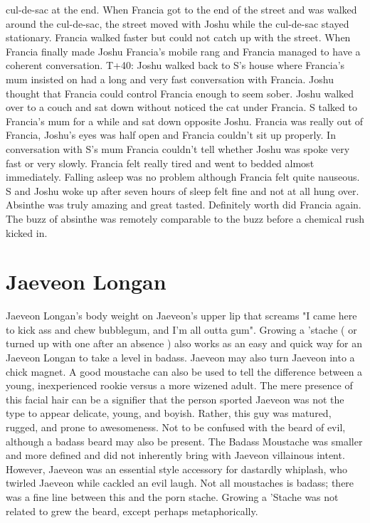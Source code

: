 \documentclass[12pt]{book}
\begin{document}
cul-de-sac at the end. When Francia got to the end of the street and was walked around the cul-de-sac, the street moved with Joshu while the cul-de-sac stayed stationary. Francia walked faster but could not catch up with the street. When Francia finally made Joshu Francia's mobile rang and Francia managed to have a coherent conversation. T+40: Joshu walked back to S's house where Francia's mum insisted on had a long and very fast conversation with Francia. Joshu thought that Francia could control Francia enough to seem sober. Joshu walked over to a couch and sat down without noticed the cat under Francia. S talked to Francia's mum for a while and sat down opposite Joshu. Francia was really out of Francia, Joshu's eyes was half open and Francia couldn't sit up properly. In conversation with S's mum Francia couldn't tell whether Joshu was spoke very fast or very slowly. Francia felt really tired and went to bedded almost immediately. Falling asleep was no problem although Francia felt quite nauseous. S and Joshu woke up after seven hours of sleep felt fine and not at all hung over. Absinthe was truly amazing and great tasted. Definitely worth did Francia again. The buzz of absinthe was remotely comparable to the buzz before a chemical rush kicked in.



\chapter{Jaeveon Longan}

Jaeveon Longan's body weight on Jaeveon's upper lip that screams "I came here to kick ass and chew bubblegum, and I'm all outta gum". Growing a 'stache ( or turned up with one after an absence ) also works as an easy and quick way for an Jaeveon Longan to take a level in badass. Jaeveon may also turn Jaeveon into a chick magnet. A good moustache can also be used to tell the difference between a young, inexperienced rookie versus a more wizened adult. The mere presence of this facial hair can be a signifier that the person sported Jaeveon was not the type to appear delicate, young, and boyish. Rather, this guy was matured, rugged, and prone to awesomeness. Not to be confused with the beard of evil, although a badass beard may also be present. The Badass Moustache was smaller and more defined and did not inherently bring with Jaeveon villainous intent. However, Jaeveon was an essential style accessory for dastardly whiplash, who twirled Jaeveon while cackled an evil laugh. Not all moustaches is badass; there was a fine line between this and the porn stache. Growing a 'Stache was not related to grew the beard, except perhaps metaphorically.
\end{document}
